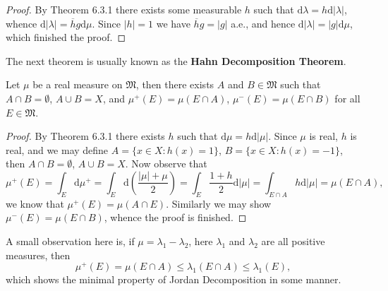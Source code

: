 \begin{proof}
By Theorem 6.3.1 there exists some measurable $h$ such that $\mathrm{d}\lambda=h\mathrm{d}|\lambda|$, whence $\mathrm{d}|\lambda|=\overline{h}g\mathrm{d}\mu$. Since $|h|=1$ we have $\overline{h}g=|g|$ a.e., and hence $\mathrm{d}|\lambda|=|g|\mathrm{d}\mu$, which finished the proof.
\end{proof}
The next theorem is usually known as the \textbf{Hahn Decomposition Theorem}.
\begin{theorem}
Let $\mu$ be a real measure on $\mathfrak{M}$, then there exists $A$ and $B\in\mathfrak{M}$ such that $A\cap B=\emptyset$, $A\cup B=X$, and $\mu^+(E)=\mu(E\cap A)$, $\mu^-(E)=\mu(E\cap B)$ for all $E\in\mathfrak{M}$.
\end{theorem}
\begin{proof}
By Theorem 6.3.1 there exists $h$ such that $\mathrm{d}\mu=h\mathrm{d}|\mu|$. Since $\mu$ is real, $h$ is real, and we may define $A=\{x\in X:h(x)=1\}$, $B=\{x\in X:h(x)=-1\}$, then $A\cap B=\emptyset$, $A\cup B=X$. Now observe that 
$$
\mu ^+\left( E \right) =\int_E{\mathrm{d}\mu ^+}=\int_E{\mathrm{d}\left( \frac{\left| \mu \right|+\mu}{2} \right)}=\int_E{\frac{1+h}{2}\mathrm{d}\left| \mu \right|}=\int_{E\cap A}{h\mathrm{d}\left| \mu \right|}=\mu \left( E\cap A \right) ,
$$
we know that $\mu^+(E)=\mu(A\cap E)$. Similarly we may show $\mu^-(E)=\mu(E\cap B)$, whence the proof is finished.
\end{proof}
A small observation here is, if $\mu=\lambda_1-\lambda_2$, here $\lambda_1$ and $\lambda_2$ are all positive measures, then 
$$
\mu ^+\left( E \right) =\mu \left( E\cap A \right) \le \lambda _1\left( E\cap A \right) \le \lambda _1\left( E \right) ,
$$
which shows the minimal property of Jordan Decomposition in some manner.
